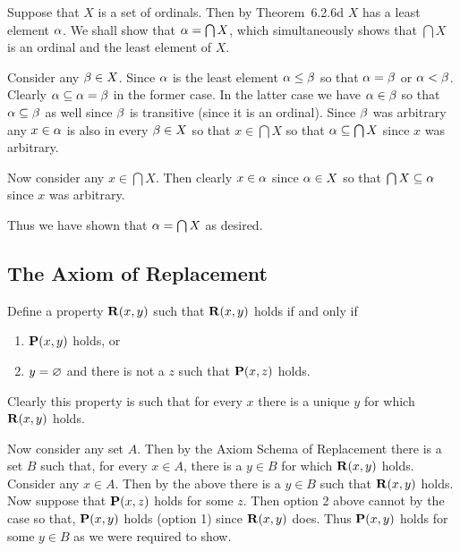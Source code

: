 
\begin{solution}
	Suppose that $X$ is a set of ordinals.
    Then by Theorem~6.2.6d $X$ has a least element $\alpha$.
    We shall show that $\alpha = \bigcap X$, which simultaneously shows that $\bigcap X$ is an ordinal and the least element of $X$.

    Consider any $\beta \in X$.
    Since $\alpha$ is the least element $\alpha \leq \beta$ so that $\alpha = \beta$ or $\alpha < \beta$.
    Clearly $\alpha \subseteq \alpha = \beta$ in the former case.
    In the latter case we have $\alpha \in \beta$ so that $\alpha \subseteq \beta$ as well since $\beta$ is transitive (since it is an ordinal).
    Since $\beta$ was arbitrary any $x \in \alpha$ is also in every $\beta \in X$ so that $x \in \bigcap X$ so that $\alpha \subseteq \bigcap X$ since $x$ was arbitrary.

    Now consider any $x \in \bigcap X$.
    Then clearly $x \in \alpha$ since $\alpha \in X$ so that $\bigcap X \subseteq \alpha$ since $x$ was arbitrary.

    Thus we have shown that $\alpha = \bigcap X$ as desired. \qedsymbol
\end{solution}

\subsection{The Axiom of Replacement}

\begin{solution}
	Define a property $\mathbf{R}(x,y)$ such that $\mathbf{R}(x,y)$ holds if and only if
    \begin{enumerate}
        \item $\mathbf{P}(x,y)$ holds, or
        \item $y = \varnothing$ and there is not a $z$ such that $\mathbf{P}(x,z)$ holds.
    \end{enumerate}
    Clearly this property is such that for every $x$ there is a unique $y$ for which $\mathbf{R}(x,y)$ holds.

    Now consider any set $A$.
    Then by the Axiom Schema of Replacement there is a set $B$ such that, for every $x \in A$, there is a $y \in B$ for which $\mathbf{R}(x,y)$ holds.
    Consider any $x \in A$.
    Then by the above there is a $y \in B$ such that $\mathbf{R}(x,y)$ holds.
    Now suppose that $\mathbf{P}(x,z)$ holds for some $z$.
    Then option 2 above cannot by the case so that, $\mathbf{P}(x,y)$ holds (option 1) since $\mathbf{R}(x,y)$ does.
    Thus $\mathbf{P}(x,y)$ holds for some $y \in B$ as we were required to show. \qedsymbol
\end{solution}

